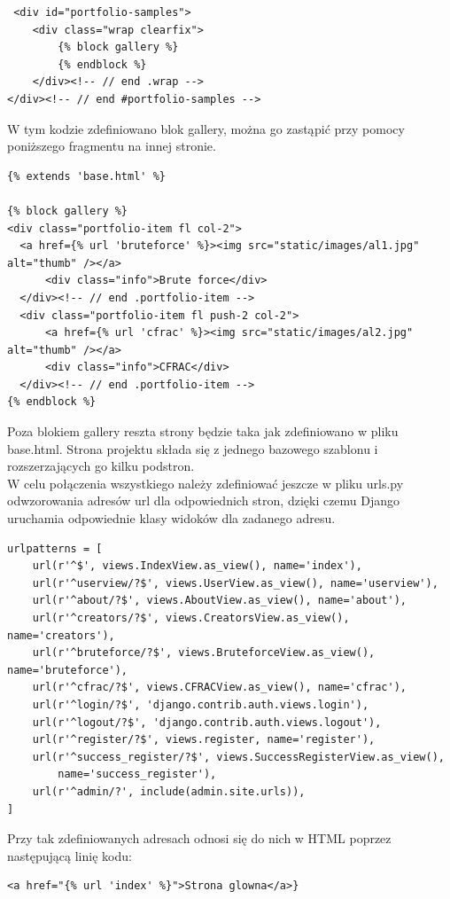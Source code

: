 \documentclass{article}
\begin{document}
\begin{lstlisting}
 <div id="portfolio-samples">
    <div class="wrap clearfix">
        {% block gallery %}
        {% endblock %}
    </div><!-- // end .wrap -->
</div><!-- // end #portfolio-samples -->
\end{lstlisting}

W tym kodzie zdefiniowano blok gallery, można go zastąpić przy pomocy poniższego fragmentu na innej stronie. 

\begin{lstlisting}
{% extends 'base.html' %}

{% block gallery %}
<div class="portfolio-item fl col-2">
  <a href={% url 'bruteforce' %}><img src="static/images/al1.jpg" alt="thumb" /></a>
      <div class="info">Brute force</div>
  </div><!-- // end .portfolio-item -->
  <div class="portfolio-item fl push-2 col-2">
      <a href={% url 'cfrac' %}><img src="static/images/al2.jpg" alt="thumb" /></a>
      <div class="info">CFRAC</div>
  </div><!-- // end .portfolio-item -->
{% endblock %}
\end{lstlisting}

Poza blokiem gallery reszta strony będzie taka jak zdefiniowano w pliku base.html. Strona projektu składa się z jednego bazowego szablonu i rozszerzających go kilku podstron.\\

W celu połączenia wszystkiego należy zdefiniować jeszcze w pliku urls.py odwzorowania adresów url dla odpowiednich stron, dzięki czemu Django uruchamia odpowiednie klasy widoków dla zadanego adresu.

\begin{lstlisting}
urlpatterns = [
    url(r'^$', views.IndexView.as_view(), name='index'),
    url(r'^userview/?$', views.UserView.as_view(), name='userview'),
    url(r'^about/?$', views.AboutView.as_view(), name='about'),
    url(r'^creators/?$', views.CreatorsView.as_view(), name='creators'),
    url(r'^bruteforce/?$', views.BruteforceView.as_view(), name='bruteforce'),
    url(r'^cfrac/?$', views.CFRACView.as_view(), name='cfrac'),
    url(r'^login/?$', 'django.contrib.auth.views.login'),
    url(r'^logout/?$', 'django.contrib.auth.views.logout'),
    url(r'^register/?$', views.register, name='register'),
    url(r'^success_register/?$', views.SuccessRegisterView.as_view(),
        name='success_register'),
    url(r'^admin/?', include(admin.site.urls)),
]
\end{lstlisting}

Przy tak zdefiniowanych adresach odnosi się do nich w HTML poprzez następującą linię kodu:
\begin{lstlisting}
<a href="{% url 'index' %}">Strona glowna</a>}
\end{lstlisting}
\end{document}
